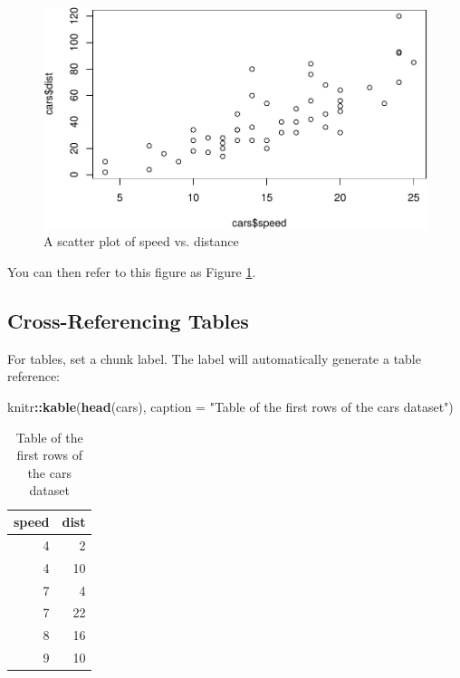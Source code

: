 \documentclass[
]{book}
\newenvironment{Shaded}{\begin{snugshade}}{\end{snugshade}}
\newcommand{\AttributeTok}[1]{\textcolor[rgb]{0.13,0.29,0.53}{#1}}
\newcommand{\FunctionTok}[1]{\textcolor[rgb]{0.13,0.29,0.53}{\textbf{#1}}}
\newcommand{\NormalTok}[1]{#1}
\newcommand{\SpecialCharTok}[1]{\textcolor[rgb]{0.81,0.36,0.00}{\textbf{#1}}}
\newcommand{\StringTok}[1]{\textcolor[rgb]{0.31,0.60,0.02}{#1}}
\theoremstyle{definition}
\theoremstyle{definition}
\theoremstyle{definition}
\theoremstyle{definition}
\theoremstyle{remark}
\begin{document}
\begin{figure}

{\centering \includegraphics{_main_files/figure-latex/speed-distance-plot-1} 

}

\caption{A scatter plot of speed vs. distance}\label{fig:speed-distance-plot}
\end{figure}

You can then refer to this figure as Figure \ref{fig:speed-distance-plot}.

\subsection{Cross-Referencing Tables}\label{cross-referencing-tables}

For tables, set a chunk label. The label will automatically generate a table reference:

\begin{Shaded}
\begin{Highlighting}[]
\NormalTok{knitr}\SpecialCharTok{::}\FunctionTok{kable}\NormalTok{(}\FunctionTok{head}\NormalTok{(cars), }\AttributeTok{caption =} \StringTok{"Table of the first rows of the cars dataset"}\NormalTok{)}
\end{Highlighting}
\end{Shaded}

\begin{table}

\caption{\label{tab:cars-table}Table of the first rows of the cars dataset}
\centering
\begin{tabular}[t]{r|r}
\hline
speed & dist\\
\hline
4 & 2\\
\hline
4 & 10\\
\hline
7 & 4\\
\hline
7 & 22\\
\hline
8 & 16\\
\hline
9 & 10\\
\hline
\end{tabular}
\end{table}
\end{document}
